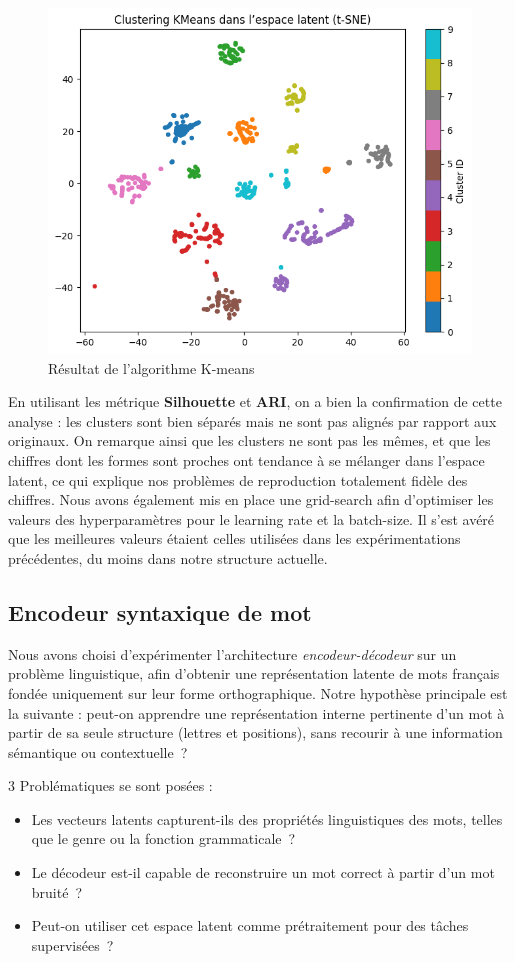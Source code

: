 \documentclass{article}
\begin{document}
\begin{figure}[H]
    \centering
    \includegraphics[width=0.8\linewidth]{Images/k-means.png}
    \caption{Résultat de l'algorithme K-means}
    \label{fig:k-means}
\end{figure}
En utilisant les métrique \textbf{Silhouette} et \textbf{ARI}, on a bien la confirmation de cette analyse : les clusters sont bien séparés mais ne sont pas alignés par rapport aux originaux.
On remarque ainsi que les clusters ne sont pas les mêmes, et que les chiffres dont les formes sont proches ont tendance à se mélanger dans l'espace latent, ce qui explique nos problèmes de reproduction totalement fidèle des chiffres.
Nous avons également mis en place une grid-search afin d'optimiser les valeurs des hyperparamètres pour le learning rate et la batch-size. Il s'est avéré que les meilleures valeurs étaient celles utilisées dans les expérimentations précédentes, du moins dans notre structure actuelle.

\subsection{Encodeur syntaxique de mot}

Nous avons choisi d’expérimenter l'architecture \textit{encodeur-décodeur} sur un problème linguistique, afin d’obtenir une représentation latente de mots français fondée uniquement sur leur forme orthographique. 
Notre hypothèse principale est la suivante : peut-on apprendre une représentation interne pertinente d’un mot à partir de sa seule structure (lettres et positions), sans recourir à une information sémantique ou contextuelle~?

3 Problématiques se sont posées :
\begin{itemize}
    \item Les vecteurs latents capturent-ils des propriétés linguistiques des mots, telles que le genre ou la fonction grammaticale~?
    \item Le décodeur est-il capable de reconstruire un mot correct à partir d’un mot bruité~?
    \item Peut-on utiliser cet espace latent comme prétraitement pour des tâches supervisées~?
\end{itemize}
\end{document}

